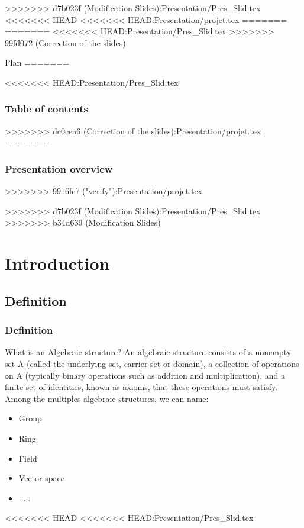 \documentclass{beamer}
\begin{document}
>>>>>>> d7b023f (Modification Slides):Presentation/Pres_Slid.tex
<<<<<<< HEAD
<<<<<<< HEAD:Presentation/projet.tex
=======
=======
<<<<<<< HEAD:Presentation/Pres_Slid.tex
>>>>>>> 99fd072 (Correction of the slides)
\begin{frame}{Plan}
\tableofcontents
=======
\begin{frame}
<<<<<<< HEAD:Presentation/Pres_Slid.tex
    \frametitle{Table of contents}
    \tableofcontents
>>>>>>> dc0cea6 (Correction of the slides):Presentation/projet.tex
=======
	\frametitle{Presentation overview } %
    \tableofcontents
>>>>>>> 9916fc7 ("verify"):Presentation/projet.tex
\end{frame}


>>>>>>> d7b023f (Modification Slides):Presentation/Pres_Slid.tex
>>>>>>> b34d639 (Modification Slides)
\section{Introduction}


\subsection{Definition}
\begin{frame}
    \frametitle{Definition}
    What is an Algebraic structure? An algebraic structure consists of a nonempty set A (called the underlying set, carrier set or domain), a collection of operations on A (typically binary operations such as addition and multiplication), and a finite set of identities, known as axioms, that these operations must satisfy.
    Among the multiples algebraic structures, we can name:
    \begin{itemize}
        \item Group
        \item Ring
        \item Field
        \item Vector space
        \item .....
    \end{itemize}
\end{frame}
<<<<<<< HEAD
<<<<<<< HEAD:Presentation/Pres_Slid.tex


\end{frame}
\end{document}
